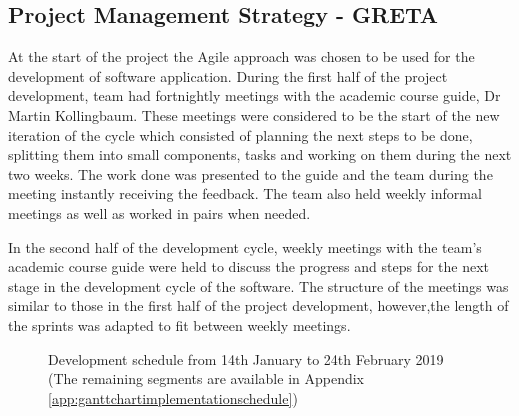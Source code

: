 \documentclass{article}
\begin{document}
    \subsection{Project Management Strategy - GRETA}
    \label{subsec:projectmanagementstrategy}

    At the start of the project the Agile approach was chosen to be used for the  development of software application. During the first half of the project development, team had fortnightly meetings with the academic course guide, Dr Martin Kollingbaum. These meetings were considered to be the start of the new iteration of the cycle which consisted of planning the next steps to be done, splitting them into small components, tasks and working on them during the next two weeks. The work done was presented to the guide and the team during the meeting instantly receiving the feedback. The team also held weekly informal meetings as well as worked in pairs when needed. \par
    
    In the second half of the development cycle, weekly meetings with the team's academic course guide were held to discuss the progress and steps for the next stage in the development cycle of the software. The structure of the meetings was similar to those in the first half of the project development, however,the length of the sprints was adapted to fit between weekly meetings.\par 
    
    \begin{figure}[ht]
        \centering
        \caption{Development schedule from 14th January to 24th February 2019 (The remaining segments are available in Appendix \ref{app:ganttchartimplementationschedule})}
        \label{fig:ganttchartschedule1}
    \end{figure}
    
\end{document}
